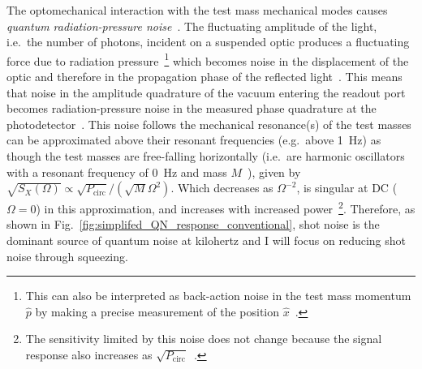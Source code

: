 
The optomechanical interaction with the test mass mechanical modes causes \emph{quantum radiation-pressure noise}~\cite{}.
The fluctuating amplitude of the light, i.e.\ the number of photons, incident on a suspended optic produces a fluctuating force due to radiation pressure~\footnote{This can also be interpreted as back-action noise in the test mass momentum $\hat p$ by making a precise measurement of the position $\hat x$~\cite{}.} which becomes noise in the displacement of the optic and therefore in the propagation phase of the reflected light~\cite{}. %
This means that noise in the amplitude quadrature of the vacuum entering the readout port becomes radiation-pressure noise in the measured phase quadrature at the photodetector~\cite{}.
This noise follows the mechanical resonance(s) of the test masses can be approximated above their resonant frequencies (e.g.\ above 1~Hz) as though the test masses are free-falling horizontally (i.e.\ are harmonic oscillators with a resonant frequency of 0~Hz and mass $M$~\cite{}), given by
$\sqrt{S_X(\Omega)}\propto\sqrt{P_\text{circ}}/(\sqrt{M}\Omega^2)$.
Which decreases as $\Omega^{-2}$, is singular at DC ($\Omega=0$) in this approximation, and increases with increased power~\footnote{The sensitivity limited by this noise does not change because the signal response also increases as $\sqrt{P_\text{circ}}$~\cite{}.}. %
Therefore, as shown in Fig.~\ref{fig:simplifed_QN_response_conventional}, shot noise is the dominant source of quantum noise at kilohertz and I will focus on reducing shot noise through squeezing.
